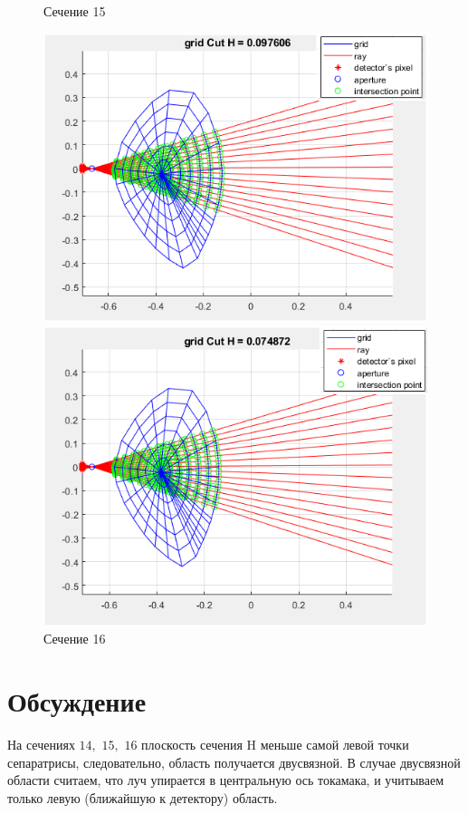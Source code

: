 \documentclass[a4]{article}
\begin{document}
\begin{figure}[H]
\begin{center}
\caption{Сечение 15}
\includegraphics{pic20.png} 

\caption{Сечение 16}
\includegraphics{pic21.png} 
\end{center}
\end{figure}


\section{Обсуждение}
На сечениях $14,$ $15,$ $16$ плоскость сечения H меньше самой левой точки сепаратрисы, следовательно, область получается двусвязной.
В случае двусвязной области считаем, что луч упирается в центральную ось токамака, и учитываем только левую (ближайшую к детектору) область.
	
\end{document}
